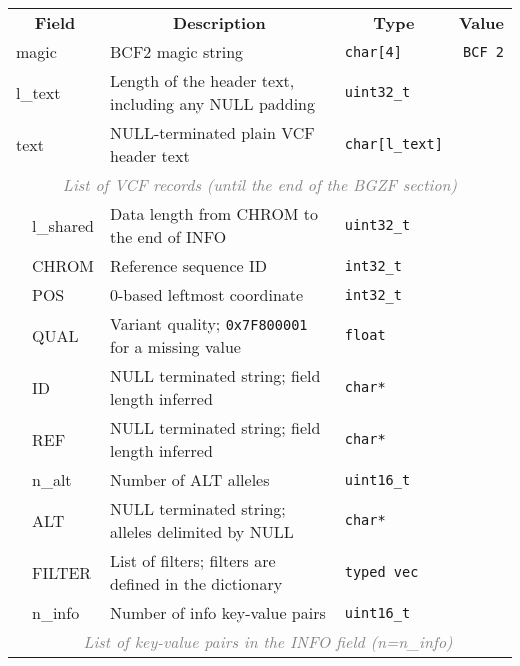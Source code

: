 \documentclass[10pt]{article}
\begin{document}
\begin{table}[ht]
\centering
{\small
\begin{tabular}{|l|l|l|p{8.2cm}|l|r|}
  \cline{1-6}
  \multicolumn{3}{|c|}{\bf Field} & \multicolumn{1}{c|}{\bf Description} & \multicolumn{1}{c|}{\bf Type} & \multicolumn{1}{c|}{\bf Value} \\\cline{1-6}
  \multicolumn{3}{|l|}{\sf magic} & BCF2 magic string & {\tt char[4]} & {\tt BCF\char92 2}\\\cline{1-6}
  \multicolumn{3}{|l|}{\sf l\_text} & Length of the header text, including any {\sf NULL} padding & {\tt uint32\_t} & \\\cline{1-6}
  \multicolumn{3}{|l|}{\sf text} & {\sf NULL}-terminated plain VCF header text & {\tt char[{\sf l\_text}]} & \\\cline{1-6}
  \multicolumn{6}{|c|}{\textcolor{gray}{\it List of VCF records (until the end of the BGZF section)}} \\\cline{2-6}
  & \multicolumn{2}{l|}{\sf l\_shared} & Data length from {\sf CHROM} to the end of {\sf INFO} & {\tt uint32\_t} & \\\cline{2-6}
  & \multicolumn{2}{l|}{\sf CHROM} & Reference sequence ID & {\tt int32\_t} & \\\cline{2-6}
  & \multicolumn{2}{l|}{\sf POS} & 0-based leftmost coordinate & {\tt int32\_t} & \\\cline{2-6}
  & \multicolumn{2}{l|}{\sf QUAL} & Variant quality; {\tt 0x7F800001} for a missing value & {\tt float} & \\\cline{2-6}
  & \multicolumn{2}{l|}{\sf ID} & {\sf NULL} terminated string; field length inferred & {\tt char*} & \\\cline{2-6}
  & \multicolumn{2}{l|}{\sf REF} & {\sf NULL} terminated string; field length inferred & {\tt char*} & \\\cline{2-6}
  & \multicolumn{2}{l|}{\sf n\_alt} & Number of {\sf ALT} alleles & {\tt uint16\_t} & \\\cline{2-6}
  & \multicolumn{2}{l|}{\sf ALT} & {\sf NULL} terminated string; alleles delimited by {\sf NULL} & {\tt char*} & \\\cline{2-6}
  & \multicolumn{2}{l|}{\sf FILTER} & List of filters; filters are defined in the dictionary & {\tt typed vec} & \\\cline{2-6}
  & \multicolumn{2}{l|}{\sf n\_info} & Number of info key-value pairs & {\tt uint16\_t} & \\\cline{2-6}
  & \multicolumn{5}{c|}{\textcolor{gray}{\it List of key-value pairs in the INFO field (n=n\_info)}} \\\cline{3-6}

\end{tabular}}
\end{table}
\end{document}

